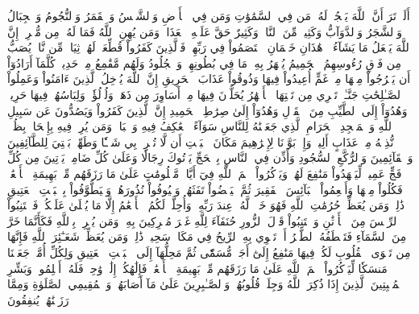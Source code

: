 أَلَمۡ تَرَ أَنَّ ٱللَّهَ يَسۡجُدُۤ لَهُۥۤ مَن فِي ٱلسَّمَٰوَٰتِ وَمَن فِي ٱلۡأَرۡضِ وَٱلشَّمۡسُ وَٱلۡقَمَرُ وَٱلنُّجُومُ وَٱلۡجِبَالُ وَٱلشَّجَرُ وَٱلدَّوَآبُّ وَكَثِيرٞ مِّنَ ٱلنَّاسِۖ وَكَثِيرٌ حَقَّ عَلَيۡهِ ٱلۡعَذَابُۗ وَمَن يُهِنِ ٱللَّهُ فَمَا لَهُۥ مِن مُّكۡرِمٍۚ إِنَّ ٱللَّهَ يَفۡعَلُ مَا يَشَآءُ۩
۞هَٰذَانِ خَصۡمَانِ ٱخۡتَصَمُواْ فِي رَبِّهِمۡۖ فَٱلَّذِينَ كَفَرُواْ قُطِّعَتۡ لَهُمۡ ثِيَابٞ مِّن نَّارٖ يُصَبُّ مِن فَوۡقِ رُءُوسِهِمُ ٱلۡحَمِيمُ
يُصۡهَرُ بِهِۦ مَا فِي بُطُونِهِمۡ وَٱلۡجُلُودُ
وَلَهُم مَّقَٰمِعُ مِنۡ حَدِيدٖ
كُلَّمَآ أَرَادُوٓاْ أَن يَخۡرُجُواْ مِنۡهَا مِنۡ غَمٍّ أُعِيدُواْ فِيهَا وَذُوقُواْ عَذَابَ ٱلۡحَرِيقِ
إِنَّ ٱللَّهَ يُدۡخِلُ ٱلَّذِينَ ءَامَنُواْ وَعَمِلُواْ ٱلصَّـٰلِحَٰتِ جَنَّـٰتٖ تَجۡرِي مِن تَحۡتِهَا ٱلۡأَنۡهَٰرُ يُحَلَّوۡنَ فِيهَا مِنۡ أَسَاوِرَ مِن ذَهَبٖ وَلُؤۡلُؤٗاۖ وَلِبَاسُهُمۡ فِيهَا حَرِيرٞ
وَهُدُوٓاْ إِلَى ٱلطَّيِّبِ مِنَ ٱلۡقَوۡلِ وَهُدُوٓاْ إِلَىٰ صِرَٰطِ ٱلۡحَمِيدِ
إِنَّ ٱلَّذِينَ كَفَرُواْ وَيَصُدُّونَ عَن سَبِيلِ ٱللَّهِ وَٱلۡمَسۡجِدِ ٱلۡحَرَامِ ٱلَّذِي جَعَلۡنَٰهُ لِلنَّاسِ سَوَآءً ٱلۡعَٰكِفُ فِيهِ وَٱلۡبَادِۚ وَمَن يُرِدۡ فِيهِ بِإِلۡحَادِۭ بِظُلۡمٖ نُّذِقۡهُ مِنۡ عَذَابٍ أَلِيمٖ
وَإِذۡ بَوَّأۡنَا لِإِبۡرَٰهِيمَ مَكَانَ ٱلۡبَيۡتِ أَن لَّا تُشۡرِكۡ بِي شَيۡـٔٗا وَطَهِّرۡ بَيۡتِيَ لِلطَّآئِفِينَ وَٱلۡقَآئِمِينَ وَٱلرُّكَّعِ ٱلسُّجُودِ
وَأَذِّن فِي ٱلنَّاسِ بِٱلۡحَجِّ يَأۡتُوكَ رِجَالٗا وَعَلَىٰ كُلِّ ضَامِرٖ يَأۡتِينَ مِن كُلِّ فَجٍّ عَمِيقٖ
لِّيَشۡهَدُواْ مَنَٰفِعَ لَهُمۡ وَيَذۡكُرُواْ ٱسۡمَ ٱللَّهِ فِيٓ أَيَّامٖ مَّعۡلُومَٰتٍ عَلَىٰ مَا رَزَقَهُم مِّنۢ بَهِيمَةِ ٱلۡأَنۡعَٰمِۖ فَكُلُواْ مِنۡهَا وَأَطۡعِمُواْ ٱلۡبَآئِسَ ٱلۡفَقِيرَ
ثُمَّ لۡيَقۡضُواْ تَفَثَهُمۡ وَلۡيُوفُواْ نُذُورَهُمۡ وَلۡيَطَّوَّفُواْ بِٱلۡبَيۡتِ ٱلۡعَتِيقِ
ذَٰلِكَۖ وَمَن يُعَظِّمۡ حُرُمَٰتِ ٱللَّهِ فَهُوَ خَيۡرٞ لَّهُۥ عِندَ رَبِّهِۦۗ وَأُحِلَّتۡ لَكُمُ ٱلۡأَنۡعَٰمُ إِلَّا مَا يُتۡلَىٰ عَلَيۡكُمۡۖ فَٱجۡتَنِبُواْ ٱلرِّجۡسَ مِنَ ٱلۡأَوۡثَٰنِ وَٱجۡتَنِبُواْ قَوۡلَ ٱلزُّورِ
حُنَفَآءَ لِلَّهِ غَيۡرَ مُشۡرِكِينَ بِهِۦۚ وَمَن يُشۡرِكۡ بِٱللَّهِ فَكَأَنَّمَا خَرَّ مِنَ ٱلسَّمَآءِ فَتَخۡطَفُهُ ٱلطَّيۡرُ أَوۡ تَهۡوِي بِهِ ٱلرِّيحُ فِي مَكَانٖ سَحِيقٖ
ذَٰلِكَۖ وَمَن يُعَظِّمۡ شَعَـٰٓئِرَ ٱللَّهِ فَإِنَّهَا مِن تَقۡوَى ٱلۡقُلُوبِ
لَكُمۡ فِيهَا مَنَٰفِعُ إِلَىٰٓ أَجَلٖ مُّسَمّٗى ثُمَّ مَحِلُّهَآ إِلَى ٱلۡبَيۡتِ ٱلۡعَتِيقِ
وَلِكُلِّ أُمَّةٖ جَعَلۡنَا مَنسَكٗا لِّيَذۡكُرُواْ ٱسۡمَ ٱللَّهِ عَلَىٰ مَا رَزَقَهُم مِّنۢ بَهِيمَةِ ٱلۡأَنۡعَٰمِۗ فَإِلَٰهُكُمۡ إِلَٰهٞ وَٰحِدٞ فَلَهُۥٓ أَسۡلِمُواْۗ وَبَشِّرِ ٱلۡمُخۡبِتِينَ
ٱلَّذِينَ إِذَا ذُكِرَ ٱللَّهُ وَجِلَتۡ قُلُوبُهُمۡ وَٱلصَّـٰبِرِينَ عَلَىٰ مَآ أَصَابَهُمۡ وَٱلۡمُقِيمِي ٱلصَّلَوٰةِ وَمِمَّا رَزَقۡنَٰهُمۡ يُنفِقُونَ
